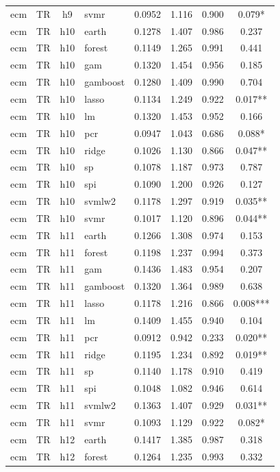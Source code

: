 \begin{ThreePartTable}
\begin{longtable}[t]{llclcccc}
ecm & TR & h9 & svmr & 0.0952 & 1.116 & 0.900 & 0.079*\\
\addlinespace
ecm & TR & h10 & earth & 0.1278 & 1.407 & 0.986 & 0.237\\
ecm & TR & h10 & forest & 0.1149 & 1.265 & 0.991 & 0.441\\
ecm & TR & h10 & gam & 0.1320 & 1.454 & 0.956 & 0.185\\
ecm & TR & h10 & gamboost & 0.1280 & 1.409 & 0.990 & 0.704\\
ecm & TR & h10 & lasso & 0.1134 & 1.249 & 0.922 & 0.017**\\
ecm & TR & h10 & lm & 0.1320 & 1.453 & 0.952 & 0.166\\
ecm & TR & h10 & pcr & 0.0947 & 1.043 & 0.686 & 0.088*\\
ecm & TR & h10 & ridge & 0.1026 & 1.130 & 0.866 & 0.047**\\
ecm & TR & h10 & sp & 0.1078 & 1.187 & 0.973 & 0.787\\
ecm & TR & h10 & spi & 0.1090 & 1.200 & 0.926 & 0.127\\
ecm & TR & h10 & svmlw2 & 0.1178 & 1.297 & 0.919 & 0.035**\\
ecm & TR & h10 & svmr & 0.1017 & 1.120 & 0.896 & 0.044**\\
\addlinespace
ecm & TR & h11 & earth & 0.1266 & 1.308 & 0.974 & 0.153\\
ecm & TR & h11 & forest & 0.1198 & 1.237 & 0.994 & 0.373\\
ecm & TR & h11 & gam & 0.1436 & 1.483 & 0.954 & 0.207\\
ecm & TR & h11 & gamboost & 0.1320 & 1.364 & 0.989 & 0.638\\
ecm & TR & h11 & lasso & 0.1178 & 1.216 & 0.866 & 0.008***\\
ecm & TR & h11 & lm & 0.1409 & 1.455 & 0.940 & 0.104\\
ecm & TR & h11 & pcr & 0.0912 & 0.942 & 0.233 & 0.020**\\
ecm & TR & h11 & ridge & 0.1195 & 1.234 & 0.892 & 0.019**\\
ecm & TR & h11 & sp & 0.1140 & 1.178 & 0.910 & 0.419\\
ecm & TR & h11 & spi & 0.1048 & 1.082 & 0.946 & 0.614\\
ecm & TR & h11 & svmlw2 & 0.1363 & 1.407 & 0.929 & 0.031**\\
ecm & TR & h11 & svmr & 0.1093 & 1.129 & 0.922 & 0.082*\\
\addlinespace
ecm & TR & h12 & earth & 0.1417 & 1.385 & 0.987 & 0.318\\
ecm & TR & h12 & forest & 0.1264 & 1.235 & 0.993 & 0.332\\

\end{longtable}
\end{ThreePartTable}
